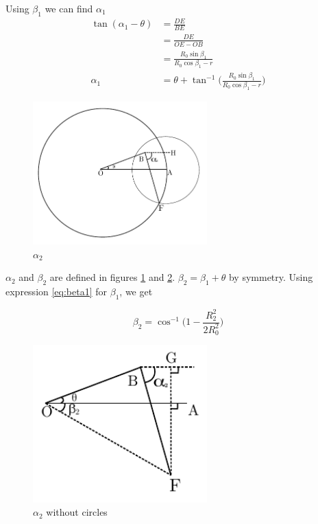 Using $\beta_1$ we can find $\alpha_1$
\begin{align*}
	\tan(\alpha_1 - \theta) &= \frac{DE}{BE} \\[2ex]
							&= \frac{DE}{OE-OB}\\[2ex]
							&= \frac{R_0 \sin\beta_1}{R_0\cos\beta_1 - r} \\[2ex]
	\alpha_1 &= \theta + \tan^{-1}\bigg( \frac{R_0 \sin\beta_1}{R_0\cos\beta_1 - r}\bigg) 
\end{align*}
\begin{figure}[h]
\centering \vspace{-0.1in}
\includegraphics[width=0.6\textwidth]{images/geo5.pdf}
\vspace{-20pt} \caption[$\alpha_2$]{\small $\alpha_2$}
\label{fig:alpha2}
\end{figure}
$\alpha_2$ and $\beta_2$ are defined in figures \ref{fig:alpha2} and \ref{fig:alpha21}. $\beta_2 = \beta_1 + \theta$ by symmetry. Using expression \ref{eq:beta1} for $\beta_1$, we get

\begin{equation}\label{eq:beta2}
	\beta_2 = \cos^{-1}\bigg(1-\frac{R_2^2}{2R_0^2}\bigg)
\end{equation}

\begin{figure}[h]
\centering \vspace{-0.1in}
\includegraphics[width=0.6\textwidth]{images/geo6.pdf}
\vspace{-20pt} \caption[$\alpha_2$ without circles]{\small $\alpha_2$ without circles}
\label{fig:alpha21}
\end{figure}

